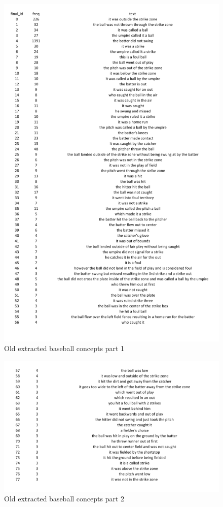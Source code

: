 \begin{figure}[h]
\caption{Old extracted baseball concepts part 1}
\centering
\includegraphics[width=\textwidth]{appendix/baseball_old1.png}
\end{figure}
\begin{figure}[h]
\caption{Old extracted baseball concepts part 2}
\centering
\includegraphics[width=\textwidth]{appendix/baseball_old2.png}
\end{figure}


